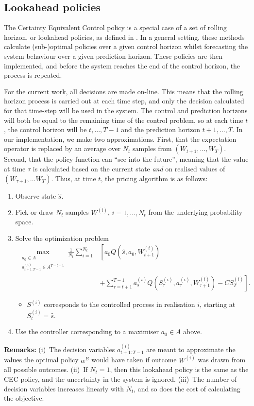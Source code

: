 \documentclass[main.tex]{subfiles}
\begin{document}
\subsection{Lookahead policies}
The Certainty Equivalent Control policy is a special case of
a set of rolling horizon, or lookahead policies, as defined in
\citet[Ch.~6]{powell2011approximate}.
In a general setting, these methods
calculate (sub-)optimal policies over a given control
horizon whilst forecasting the system behaviour over a given
prediction horizon.
These policies are then implemented, and before the system reaches the
end of the control horizon, the process is repeated.

For the current work, all decisions are made on-line. This means
that the rolling horizon process is carried out at each time step, and
only the decision calculated for that time-step will be used in
the system. The control and prediction horizons will both be equal to
the remaining time of the control problem, so at each time $t$, the
control horizon will be $t,\dots,T-1$ and the prediction horizon
$t+1,\dots,T$.
In our implementation, we make two approximations.
First, that the expectation operator is replaced by
an average over $N_t$ samples from $(W_{t+1},\dots,W_T)$.
Second, that
the policy function can ``see into the future'', meaning that
the value at time $\tau$ is calculated based on
the current state \emph{and}  on realised values of $(W_{\tau+1},\dots W_{T})$.
Thus, at time $t$, the pricing algorithm is as follows:
\begin{enumerate}
\item Observe state $\hat s$.
\item Pick or draw $N_t$ samples $W^{(i)}$, $i=1,\dots,N_t$ from the
  underlying probability space.
\item Solve the optimization problem
  \begin{align}\nonumber
    \max_{\substack{a_0\in A\\a_{t+1:T-1}^{(i)}\in A^{T-{t+1}}}}
    \frac{1}{N_t}\sum_{i=1}^{N_t}&\left[
    a_0Q(\hat s,a_0,W_{t+1}^{(i)})
    \phantom{+\sum_{\tau=t+1}^{T-1}}\right.\\
      &\left.+\sum_{\tau=t+1}^{T-1}a_s^{(i)}Q(S_\tau^{(i)},a_\tau^{(i)},W_{\tau+1}^{(i)})
      -C S_T^{(i)}\right].
  \end{align}
  \begin{itemize}
  \item $S^{(i)}$ corresponds to the
    controlled process in realisation $i$, starting at $S_t^{(i)}=\hat s$.
  \end{itemize}
\item Use the controller corresponding to a maximiser $a_0\in
  A$ above.
\end{enumerate}
\textbf{Remarks:} (i)~The decision variables $a_{t+1:T-1}^{(i)}$ are meant to
approximate the values the optimal policy $\alpha^B$ would have taken
if outcome $W^{(i)}$ was drawn from all possible outcomes.
(ii)~If $N_t=1$, then this lookahead policy is the same as the
CEC policy, and the uncertainty in the system is ignored.
(iii)~The number of decision variables increases linearly with $N_t$, and
so does the cost of calculating the objective.
\end{document}
